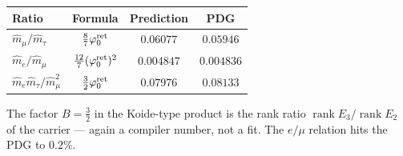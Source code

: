 \begin{center}\small
\renewcommand{\arraystretch}{1.15}
\begin{tabularx}{\linewidth}{@{}lccc@{}}
\toprule
\textbf{Ratio} & \textbf{Formula} & \textbf{Prediction} & \textbf{PDG} \\
\midrule
$\hat m_\mu/\hat m_\tau$ & $\tfrac87\varphi_0^{\mathrm{ret}}$ & $0.06077$ & $0.05946$ \\
$\hat m_e/\hat m_\mu$ & $\tfrac{12}{7}(\varphi_0^{\mathrm{ret}})^2$ & $0.004847$ & $0.004836$ \\
$\hat m_e\hat m_\tau/\hat m_\mu^2$ & $\tfrac32\varphi_0^{\mathrm{ret}}$ & $0.07976$ & $0.08133$ \\
\bottomrule
\end{tabularx}
\end{center}

\noindent The factor $B=\tfrac32$ in the Koide-type product is the rank ratio
$\operatorname{rank}E_3/\operatorname{rank}E_2$ of the carrier --- again a compiler number, not a fit.
The $e/\mu$ relation hits the PDG to $0.2\%$.

